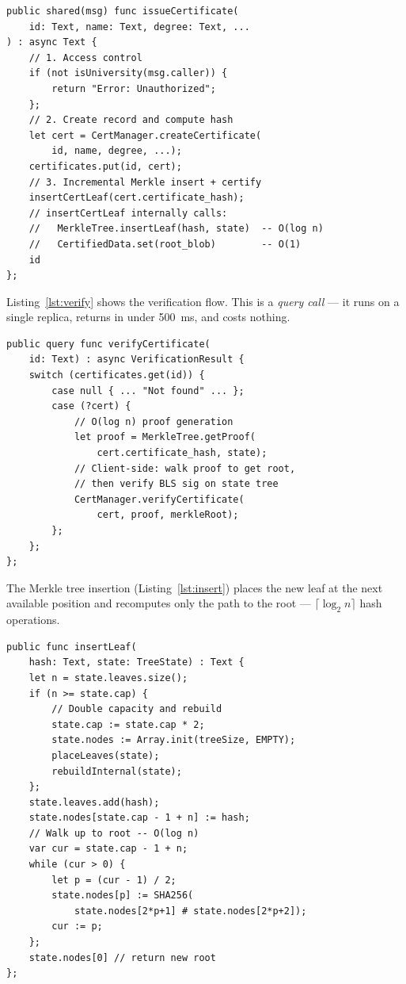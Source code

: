 \documentclass[conference]{IEEEtran}
\begin{document}
\begin{lstlisting}[caption={Simplified issuance flow in Motoko},label={lst:issue},language={}]
public shared(msg) func issueCertificate(
    id: Text, name: Text, degree: Text, ...
) : async Text {
    // 1. Access control
    if (not isUniversity(msg.caller)) {
        return "Error: Unauthorized";
    };
    // 2. Create record and compute hash
    let cert = CertManager.createCertificate(
        id, name, degree, ...);
    certificates.put(id, cert);
    // 3. Incremental Merkle insert + certify
    insertCertLeaf(cert.certificate_hash);
    // insertCertLeaf internally calls:
    //   MerkleTree.insertLeaf(hash, state)  -- O(log n)
    //   CertifiedData.set(root_blob)        -- O(1)
    id
};
\end{lstlisting}

Listing~\ref{lst:verify} shows the verification flow. This is a \emph{query call} — it runs on a single replica, returns in under 500~ms, and costs nothing.

\begin{lstlisting}[caption={Simplified verification flow},label={lst:verify},language={}]
public query func verifyCertificate(
    id: Text) : async VerificationResult {
    switch (certificates.get(id)) {
        case null { ... "Not found" ... };
        case (?cert) {
            // O(log n) proof generation
            let proof = MerkleTree.getProof(
                cert.certificate_hash, state);
            // Client-side: walk proof to get root,
            // then verify BLS sig on state tree
            CertManager.verifyCertificate(
                cert, proof, merkleRoot);
        };
    };
};
\end{lstlisting}

The Merkle tree insertion (Listing~\ref{lst:insert}) places the new leaf at the next available position and recomputes only the path to the root — $\lceil\log_2 n\rceil$ hash operations.

\begin{lstlisting}[caption={Incremental Merkle leaf insertion},label={lst:insert},language={}]
public func insertLeaf(
    hash: Text, state: TreeState) : Text {
    let n = state.leaves.size();
    if (n >= state.cap) {
        // Double capacity and rebuild
        state.cap := state.cap * 2;
        state.nodes := Array.init(treeSize, EMPTY);
        placeLeaves(state);
        rebuildInternal(state);
    };
    state.leaves.add(hash);
    state.nodes[state.cap - 1 + n] := hash;
    // Walk up to root -- O(log n)
    var cur = state.cap - 1 + n;
    while (cur > 0) {
        let p = (cur - 1) / 2;
        state.nodes[p] := SHA256(
            state.nodes[2*p+1] # state.nodes[2*p+2]);
        cur := p;
    };
    state.nodes[0] // return new root
};
\end{lstlisting}
\end{document}
